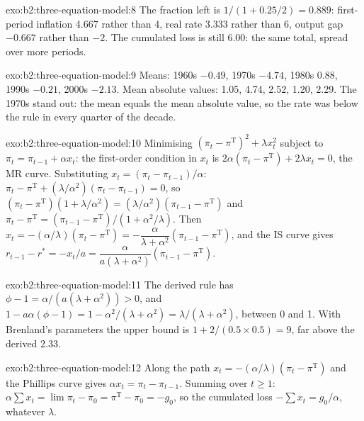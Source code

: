 \begin{solution}{exo:b2:three-equation-model:8}
The fraction left is $1/(1 + 0.25/2) = 0.889$: first-period inflation 4.667 rather than 4, real rate 3.333 rather than 6, output gap $-0.667$ rather than $-2$. The
cumulated loss is still 6.00: the same total, spread over more periods.
\end{solution}

\begin{solution}{exo:b2:three-equation-model:9}
Means: 1960s $-0.49$, 1970s $-4.74$, 1980s 0.88, 1990s $-0.21$, 2000s $-2.13$. Mean absolute values: 1.05, 4.74, 2.52, 1.20, 2.29. The 1970s stand out: the mean equals the mean absolute value, so the rate was below the rule
in every quarter of the decade.
\end{solution}

\begin{solution}{exo:b2:three-equation-model:10}
Minimising $(\pi_t - \pi^{\mathrm T})^2 + \lambda x_t^2$ subject to $\pi_t = \pi_{t-1} + \alpha x_t$: the first-order condition in $x_t$ is $2\alpha(\pi_t - \pi^{\mathrm T}) + 2\lambda x_t = 0$, the MR curve. Substituting $x_t = (\pi_t - \pi_{t-1})/\alpha$: $\pi_t - \pi^{\mathrm T} + (\lambda/\alpha^2)(\pi_t - \pi_{t-1}) = 0$, so
$(\pi_t - \pi^{\mathrm T})(1 + \lambda/\alpha^2) = (\lambda/\alpha^2)(\pi_{t-1} - \pi^{\mathrm T})$ and $\pi_t - \pi^{\mathrm T} = (\pi_{t-1} - \pi^{\mathrm T})/(1 + \alpha^2/\lambda)$. Then $x_t = -(\alpha/\lambda)(\pi_t - \pi^{\mathrm T}) = -\dfrac{\alpha}{\lambda + \alpha^2}(\pi_{t-1} - \pi^{\mathrm T})$, and the IS curve gives $r_{t-1} - r^* = -x_t/a = \dfrac{\alpha}{a(\lambda + \alpha^2)}(\pi_{t-1} - \pi^{\mathrm T})$.
\end{solution}

\begin{solution}{exo:b2:three-equation-model:11}
The derived rule has $\phi - 1 = \alpha/(a(\lambda + \alpha^2)) > 0$, and $1 - a\alpha(\phi - 1) = 1 - \alpha^2/(\lambda + \alpha^2) = \lambda/(\lambda + \alpha^2)$, between 0 and 1. With Brenland's parameters the upper bound is $1 + 2/(0.5 \times 0.5) = 9$, far above the derived 2.33.
\end{solution}

\begin{solution}{exo:b2:three-equation-model:12}
Along the path $x_t = -(\alpha/\lambda)(\pi_t - \pi^{\mathrm T})$ and the Phillips curve gives $\alpha x_t = \pi_t - \pi_{t-1}$. Summing over $t \geq 1$: $\alpha\sum x_t = \lim \pi_t - \pi_0 = \pi^{\mathrm T} - \pi_0 = -g_0$, so the cumulated loss $-\sum x_t = g_0/\alpha$, whatever $\lambda$.
\end{solution}

